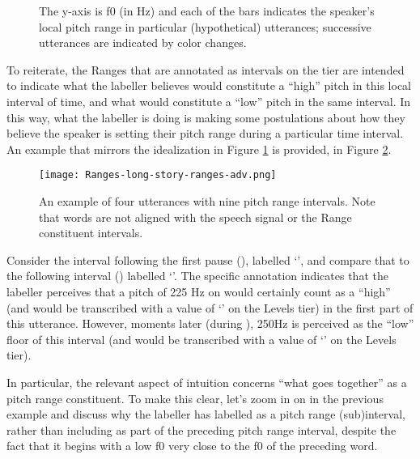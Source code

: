 \begin{figure}[H]
\centering
%

%
\caption[An idealization of pitch ranges in four hypothetical utterances.]{The y-axis is f0 (in Hz) and each of the bars indicates the speaker’s local pitch range in particular (hypothetical) utterances; successive utterances are indicated by color changes.%
\label{fig:Ranges bars}%
}
\end{figure}


To reiterate, the Ranges that are annotated as intervals on the tier are intended to indicate what the labeller believes would constitute a “high” pitch in this local interval of time, and what would constitute a “low” pitch in the same interval. In this way, what the labeller is doing is making some postulations about how they believe the speaker is setting their pitch range during a particular time interval. An example that mirrors the idealization in Figure \ref{fig:Ranges bars} is provided, in Figure \ref{fig:long-story-ranges Ranges Adv}.

\begin{figure}[H]
\centering
%
\texttt{[image: Ranges-long-story-ranges-adv.png]}
%
\caption[An example of four utterances with nine pitch range intervals.]{An example of four utterances with nine pitch range intervals. Note that words are not aligned with the speech signal or the Range constituent intervals.%
\label{fig:long-story-ranges Ranges Adv}%
}
\end{figure}

Consider the interval following the first pause (), labelled ‘’, and compare that to the following interval () labelled ‘’. The specific annotation indicates that the labeller perceives that a pitch of 225 Hz on  would certainly count as a “high” (and would be transcribed with a value of ‘’ on the Levels tier) in the first part of this utterance. However, moments later (during ), 250Hz is perceived as the “low” floor of this interval (and would be transcribed with a value of ‘’ on the Levels tier).

In particular, the relevant aspect of intuition concerns “what goes together” as a pitch range constituent. To make this clear, let’s zoom in on  in the previous example and discuss why the labeller has labelled  as a pitch range (sub)interval, rather than including  as part of the preceding pitch range interval, despite the fact that it begins with a low f0 very close to the f0 of the preceding word.

